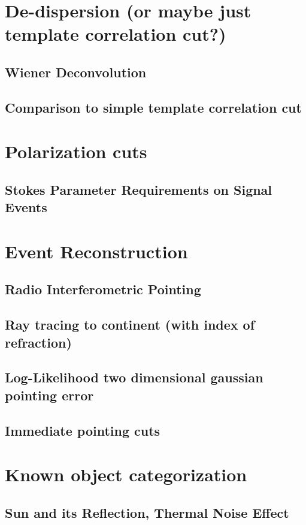 \documentclass[11pt]{uhthesis}
\begin{document}
\section{De-dispersion (or maybe just template correlation cut?)}
	\subsection{Wiener Deconvolution}
	
	\subsection{Comparison to simple template correlation cut}

\section{Polarization cuts}
	\subsection{Stokes Parameter Requirements on Signal Events}
	
\section{Event Reconstruction}
	\subsection{Radio Interferometric Pointing}
	
	\subsection{Ray tracing to continent (with index of refraction)}
	
	\subsection{Log-Likelihood two dimensional gaussian pointing error}

	\subsection{Immediate pointing cuts}


\section{Known object categorization}
	\subsection{Sun and its Reflection, Thermal Noise Effect}
\end{document}
